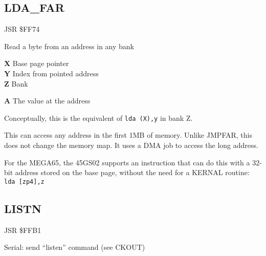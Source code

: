 \subsection{LDA{\_}FAR}
\label{KERNAL Jump Table!LDA_FAR}
\begin{description}[leftmargin=2cm,style=nextline]
    \item [Address:] JSR \$FF74
    \item [Description:] Read a byte from an address in any bank
    \item [Inputs:]
        \textbf{X} Base page pointer \\
        \textbf{Y} Index from pointed address \\
        \textbf{Z} Bank
    \item [Outputs:]
        \textbf{A} The value at the address
    \item [Remarks:]
        Conceptually, this is the equivalent of \texttt{lda (X),y} in bank Z.

        This can access any address in the first 1MB of memory. Unlike JMPFAR, this does not change the memory map. It uses a DMA job to access the long address.

        For the MEGA65, the 45GS02 supports an instruction that can do this with a 32-bit address stored on the base page, without the need for a KERNAL routine: \texttt{lda [zp4],z}
    \item [Example:]

\end{description}



\newpage
\subsection{LISTN}
\label{KERNAL Jump Table!LISTN}
\begin{description}[leftmargin=2cm,style=nextline]
    \item [Address:] JSR \$FFB1
    \item [Description:] Serial: send ``listen'' command (see CKOUT)
    \item [Inputs:]
    \item [Outputs:]
    \item [Remarks:]
    \item [Example:]
\end{description}



